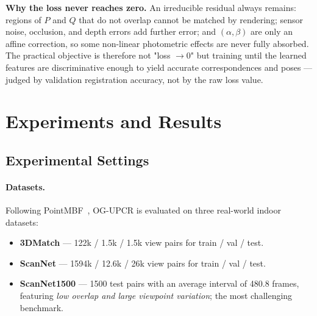 \documentclass[11pt,a4paper]{article}
\begin{document}
\begin{table}[h]
\centering
\caption{The two nested optimisation loops in OG-UPCR.}
\label{tab:loops}
\end{table}

\textbf{Why the loss never reaches zero.} An irreducible residual always remains: regions
of $P$ and $Q$ that do not overlap cannot be matched by rendering; sensor noise,
occlusion, and depth errors add further error; and $(\alpha,\beta)$ are only an affine
correction, so some non-linear photometric effects are never fully absorbed. The
practical objective is therefore not "loss $\to 0$" but training until the learned
features are discriminative enough to yield accurate correspondences and poses — judged
by validation registration accuracy, not by the raw loss value.

\section{Experiments and Results}
\label{sec:experiments}

\subsection{Experimental Settings}

\paragraph{Datasets.}
Following PointMBF~\cite{zhang2023pointmbf}, OG-UPCR is evaluated on three real-world
indoor datasets:
\begin{itemize}[noitemsep]
  \item \textbf{3DMatch} — 122k / 1.5k / 1.5k view pairs for train / val / test.
  \item \textbf{ScanNet} — 1594k / 12.6k / 26k view pairs for train / val / test.
  \item \textbf{ScanNet1500} — 1500 test pairs with an average interval of 480.8 frames,
    featuring \emph{low overlap and large viewpoint variation}; the most challenging benchmark.
\end{itemize}
\end{document}
